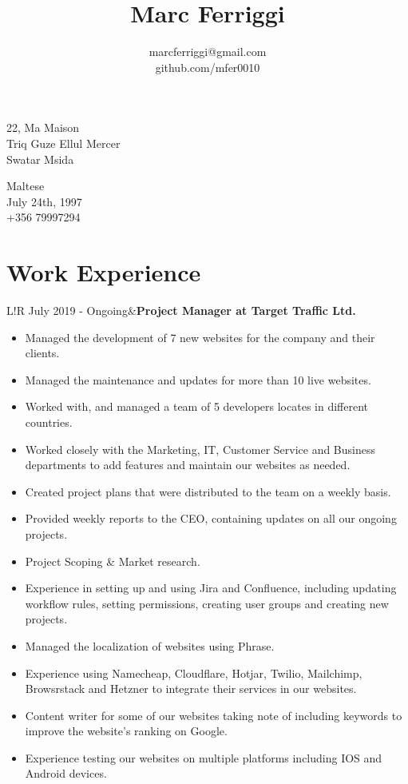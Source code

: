 \documentclass[10pt]{article}
\title{\bfseries\Huge Marc Ferriggi}
\author{marcferriggi@gmail.com\\github.com/mfer0010}
\date{}
\newcommand\VRule{\color{lightgray}\vrule width 0.5pt}
\begin{document}
	\maketitle
	
	\begin{minipage}[ht]{0.75\textwidth}
		22, Ma Maison\\
		Triq Guze Ellul Mercer\\
		Swatar Msida
	\end{minipage}
	\begin{minipage}[ht]{0.2\textwidth}
		Maltese\\
		July 24th, 1997\\
		+356 79997294
	\end{minipage}
	\vspace{15pt}
	\section*{Work Experience}
	\begin{tabular}{L!{\VRule}R}
		July 2019 - Ongoing&\textbf{Project Manager at Target Traffic Ltd.}
		\begin{itemize}
			\renewcommand\labelitemi{-$>$}
			\item Managed the development of 7 new websites for the company and their clients.
			\item Managed the maintenance and updates for more than 10 live websites.
			\item Worked with, and managed a team of 5 developers locates in different countries.
			\item Worked closely with the Marketing, IT, Customer Service and Business departments to add features and maintain our websites as needed.
			\item Created project plans that were distributed to the team on a weekly basis.
			\item Provided weekly reports to the CEO, containing updates on all our ongoing projects.
			\item Project Scoping \& Market research.
			\item Experience in setting up and using Jira and Confluence, including updating workflow rules, setting permissions, creating user groups and creating new projects.
			\item Managed the localization of websites using Phrase.
			\item Experience using Namecheap, Cloudflare, Hotjar, Twilio, Mailchimp, Browsrstack and Hetzner to integrate their services in our websites.
			\item Content writer for some of our websites taking note of including keywords to improve the website's ranking on Google.
			\item Experience testing our websites on multiple platforms including IOS and Android devices.
		\end{itemize}\\
	\end{tabular}\\
\end{document}
